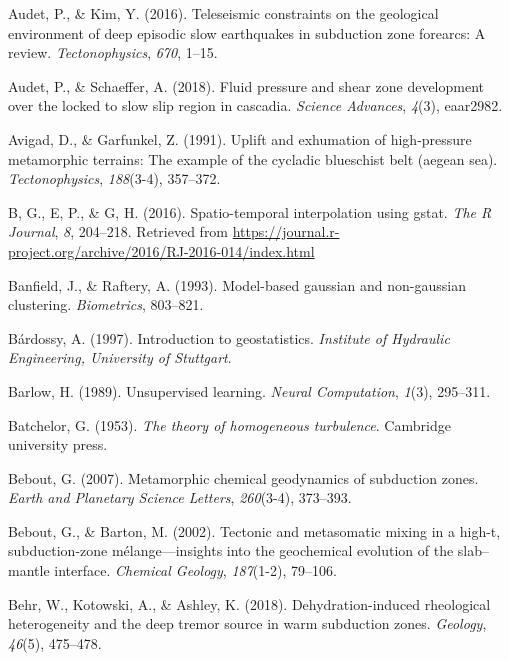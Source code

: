 \begin{CSLReferences}{1}{1}
\leavevmode{}%
Audet, P., \& Kim, Y. (2016). Teleseismic constraints on the geological environment of deep episodic slow earthquakes in subduction zone forearcs: A review. \emph{Tectonophysics}, \emph{670}, 1--15.

\leavevmode{}%
Audet, P., \& Schaeffer, A. (2018). Fluid pressure and shear zone development over the locked to slow slip region in cascadia. \emph{Science Advances}, \emph{4}(3), eaar2982.

\leavevmode{}%
Avigad, D., \& Garfunkel, Z. (1991). Uplift and exhumation of high-pressure metamorphic terrains: The example of the cycladic blueschist belt (aegean sea). \emph{Tectonophysics}, \emph{188}(3-4), 357--372.

\leavevmode{}%
B, G., E, P., \& G, H. (2016). Spatio-temporal interpolation using gstat. \emph{The R Journal}, \emph{8}, 204--218. Retrieved from \url{https://journal.r-project.org/archive/2016/RJ-2016-014/index.html}

\leavevmode{}%
Banfield, J., \& Raftery, A. (1993). Model-based gaussian and non-gaussian clustering. \emph{Biometrics}, 803--821.

\leavevmode{}%
Bárdossy, A. (1997). Introduction to geostatistics. \emph{Institute of Hydraulic Engineering, University of Stuttgart}.

\leavevmode{}%
Barlow, H. (1989). Unsupervised learning. \emph{Neural Computation}, \emph{1}(3), 295--311.

\leavevmode{}%
Batchelor, G. (1953). \emph{The theory of homogeneous turbulence}. Cambridge university press.

\leavevmode{}%
Bebout, G. (2007). Metamorphic chemical geodynamics of subduction zones. \emph{Earth and Planetary Science Letters}, \emph{260}(3-4), 373--393.

\leavevmode{}%
Bebout, G., \& Barton, M. (2002). Tectonic and metasomatic mixing in a high-t, subduction-zone m{é}lange---insights into the geochemical evolution of the slab--mantle interface. \emph{Chemical Geology}, \emph{187}(1-2), 79--106.

\leavevmode{}%
Behr, W., Kotowski, A., \& Ashley, K. (2018). Dehydration-induced rheological heterogeneity and the deep tremor source in warm subduction zones. \emph{Geology}, \emph{46}(5), 475--478.


\end{CSLReferences}

